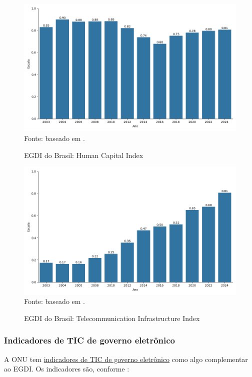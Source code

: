 \begin{figure}[H]
    \centering
    \caption{EGDI do Brasil: Human Capital Index}
    \includegraphics[width=1\linewidth]{figuras/egdi/egdi_brasil_hci.png}
    \label{fig:egdi_brasil_hci}
    \footnotesize{Fonte: baseado em \cite{ONU_edgi_mapa}.}
\end{figure}

\begin{figure}[H]
    \centering
    \caption{EGDI do Brasil: Telecommunication Infrastructure Index}
    \includegraphics[width=1\linewidth]{figuras/egdi/egdi_brasil_tsi.png}
    \label{fig:egdi_brasil_tsi}
    \footnotesize{Fonte: baseado em \cite{ONU_edgi_mapa}.}
\end{figure}

\subsubsection{Indicadores de TIC de governo eletrônico}

A ONU tem \href{https://publicadministration.un.org/egovkb/en-us/Data/ICT-in-government}{indicadores de TIC de governo eletrônico} como algo complementar ao EGDI. Os indicadores são, conforme \cite{ONU_ICT_in_government_indicators}:

